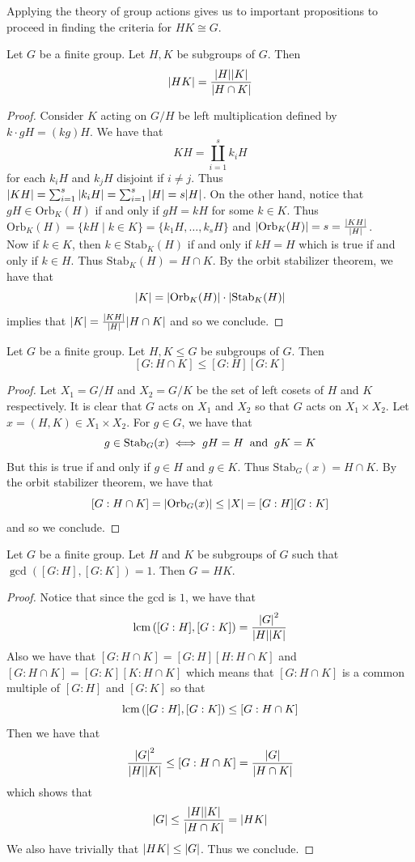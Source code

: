 \documentclass[a4paper]{article}
\begin{document}
Applying the theory of group actions gives us to important propositions to proceed in finding the criteria for $HK\cong G$. 

\begin{prp}{}{} Let $G$ be a finite group. Let $H,K$ be subgroups of $G$. Then $$\abs{HK}=\frac{\abs{H}\abs{K}}{\abs{H\cap K}}$$ 
\begin{proof}
Consider $K$ acting on $G/H$ be left multiplication defined by $k\cdot gH=(kg)H$. We have that $$KH=\coprod_{i=1}^sk_iH$$ for each $k_iH$ and $k_jH$ disjoint if $i\neq j$. Thus $\abs{KH}=\sum_{i=1}^s\abs{k_iH}=\sum_{i=1}^s\abs{H}=s\abs{H}$. On the other hand, notice that $gH\in\text{Orb}_K(H)$ if and only if $gH=kH$ for some $k\in K$. Thus $\text{Orb}_K(H)=\{kH\;|\;k\in K\}=\{k_1H,\dots,k_sH\}$ and $\abs{\text{Orb}_K(H)}=s=\frac{\abs{KH}}{\abs{H}}$. \\

Now if $k\in K$, then $k\in\text{Stab}_K(H)$ if and only if $kH=H$ which is true if and only if $k\in H$. Thus $\text{Stab}_K(H)=H\cap K$. By the orbit stabilizer theorem, we have that $$\abs{K}=\abs{\text{Orb}_K(H)}\cdot\abs{\text{Stab}_K(H)}$$ implies that $\abs{K}=\frac{\abs{KH}}{\abs{H}}\abs{H\cap K}$ and so we conclude. 
\end{proof}
\end{prp}

\begin{prp}{}{} Let $G$ be a finite group. Let $H,K\leq G$ be subgroups of $G$. Then $$[G:H\cap K]\leq[G:H][G:K]$$ 
\begin{proof}
Let $X_1=G/H$ and $X_2=G/K$ be the set of left cosets of $H$ and $K$ respectively. It is clear that $G$ acts on $X_1$ and $X_2$ so that $G$ acts on $X_1\times X_2$. Let $x=(H,K)\in X_1\times X_2$. For $g\in G$, we have that $$g\in\text{Stab}_G(x)\iff gH=H\text{\;\;and\;\;}gK=K$$ But this is true if and only if $g\in H$ and $g\in K$. Thus $\text{Stab}_G(x)=H\cap K$. By the orbit stabilizer theorem, we have that $$[G:H\cap K]=\abs{\text{Orb}_G(x)}\leq\abs{X}=[G:H][G:K]$$ and so we conclude. 
\end{proof}
\end{prp}

\begin{prp}{}{} Let $G$ be a finite group. Let $H$ and $K$ be subgroups of $G$ such that $\gcd\left([G:H],[G:K]\right)=1$. Then $G=HK$. 
\begin{proof}
Notice that since the gcd is $1$, we have that $$\operatorname{lcm}\left([G:H],[G:K]\right)=\frac{\abs{G}^2}{\abs{H}\abs{K}}$$ Also we have that $[G:H\cap K]=[G:H][H:H\cap K]$ and $[G:H\cap K]=[G:K][K:H\cap K]$ which means that $[G:H\cap K]$ is a common multiple of $[G:H]$ and $[G:K]$ so that $$\operatorname{lcm}\left([G:H],[G:K]\right)\leq[G:H\cap K]$$ Then we have that $$\frac{\abs{G}^2}{\abs{H}\abs{K}}\leq[G:H\cap K]=\frac{\abs{G}}{\abs{H\cap K}}$$ which shows that $$\abs{G}\leq\frac{\abs{H}\abs{K}}{\abs{H\cap K}}=\abs{HK}$$ We also have trivially that $\abs{HK}\leq\abs{G}$. Thus we conclude. 
\end{proof}
\end{prp}
\end{document}
